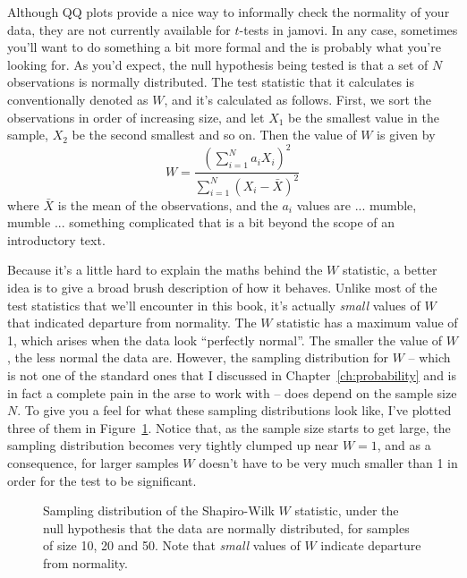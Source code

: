 
Although QQ plots provide a nice way to informally check the normality of your data, they are not currently available for $t$-tests in jamovi. In any case, sometimes you'll want to do something a bit more formal and the  \cite{Shapiro1965} is probably what you're looking for. As you'd expect, the null hypothesis being tested is that a set of $N$ observations is normally distributed. The test statistic that it calculates is conventionally denoted as $W$, and it's calculated as follows. First, we sort the observations in order of increasing size, and let $X_1$ be the smallest value in the sample, $X_2$ be the second smallest and so on. Then the value of $W$ is given by
$$
W = \frac{ \left( \sum_{i = 1}^N a_i X_i \right)^2 }{ \sum_{i = 1}^N (X_i - \bar{X})^2}
$$
where $\bar{X}$ is the mean of the observations, and the $a_i$ values are ... mumble, mumble ... something complicated that is a bit beyond the scope of an introductory text. 

Because it's a little hard to explain the maths behind the $W$ statistic, a better idea is to give a broad brush description of how it behaves. Unlike most of the test statistics that we'll encounter in this book, it's actually {\it small} values of $W$ that indicated departure from normality. The $W$ statistic has a maximum value of 1, which arises when the data look ``perfectly normal''. The smaller the value of $W$, the less normal the data are. However, the sampling distribution for $W$  -- which is not one of the standard ones that I discussed in Chapter~\ref{ch:probability} and is in fact a complete pain in the arse to work with -- does depend on the sample size $N$. To give you a feel for what these sampling distributions look like, I've plotted three of them in Figure~\ref{fig:swdist}. Notice that, as the sample size starts to get large, the sampling distribution becomes very tightly clumped up near $W=1$, and as a consequence, for larger samples $W$ doesn't have to be very much smaller than 1 in order for the test to be significant. 

\begin{figure}
\begin{center}
\caption{Sampling distribution of the Shapiro-Wilk $W$ statistic, under the null hypothesis that the data are normally distributed, for samples of size 10, 20 and 50. Note that {\it small} values of $W$ indicate departure from normality.}
\HR
\label{fig:swdist}
\end{center}
\end{figure}

